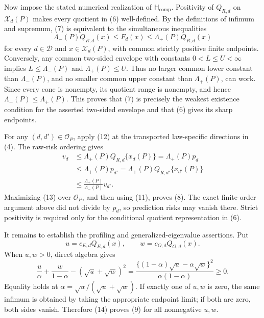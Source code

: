 Now impose the stated numerical realization of \(\mathsf H_{\mathrm{comp}}\).  Positivity of \(Q_{R,d}\) on \(\mathcal X_d(P)\) makes every quotient in (6) well-defined.  By the definitions of infimum and supremum, (7) is equivalent to the simultaneous inequalities
\[
 \Lambda_-(P)Q_{R,d}(x)
 \le F_d(x)
 \le \Lambda_+(P)Q_{R,d}(x)                                \tag{12}
\]
for every \(d\in\mathcal D\) and \(x\in\mathcal X_d(P)\), with common strictly positive finite endpoints.  Conversely, any common two-sided envelope with constants \(0<L\le U<\infty\) implies \(L\le\Lambda_-(P)\) and \(\Lambda_+(P)\le U\).  Thus no larger common lower constant than \(\Lambda_-(P)\), and no smaller common upper constant than \(\Lambda_+(P)\), can work.  Since every cone is nonempty, its quotient range is nonempty, and hence \(\Lambda_-(P)\le\Lambda_+(P)\).  This proves that (7) is precisely the weakest existence condition for the asserted two-sided envelope and that (6) gives its sharp endpoints.

For any \((d,d')\in\mathcal O_P\), apply (12) at the transported law-specific directions in (4).  The raw-risk ordering gives
\[
\begin{aligned}
 v_d
 &\le \Lambda_+(P)Q_{R,d}\{x_d(P)\}
   =\Lambda_+(P)p_d\\
 &\le \Lambda_+(P)p_{d'}
   =\Lambda_+(P)Q_{R,d'}\{x_{d'}(P)\}\\
 &\le \frac{\Lambda_+(P)}{\Lambda_-(P)}v_{d'}.
\end{aligned}                                                \tag{13}
\]
Maximizing (13) over \(\mathcal O_P\), and then using (11), proves (8).  The exact finite-order argument above did not divide by \(p_d\), so prediction risks may vanish there.  Strict positivity is required only for the conditional quotient representation in (6).

It remains to establish the profiling and generalized-eigenvalue assertions.  Put
\[
 u=c_{E,d}Q_{E,d}(x),
 \qquad
 w=c_{O,d}Q_{O,d}(x).
\]
When \(u,w>0\), direct algebra gives
\[
 \frac{u}{\alpha}+\frac{w}{1-\alpha}
 -(\sqrt u+\sqrt w)^2
 =\frac{\{(1-\alpha)\sqrt u-\alpha\sqrt w\}^{2}}
        {\alpha(1-\alpha)}\ge0.                             \tag{14}
\]
Equality holds at \(\alpha=\sqrt u/(\sqrt u+\sqrt w)\).  If exactly one of \(u,w\) is zero, the same infimum is obtained by taking the appropriate endpoint limit; if both are zero, both sides vanish.  Therefore (14) proves (9) for all nonnegative \(u,w\).

